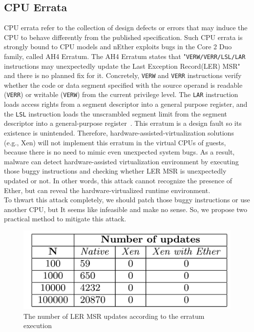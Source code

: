 \subsection{CPU Errata}
\label{sec:approach-errata}
CPU errata refer to the collection of design defects or errors that may induce the CPU to behave differently from the published specification. Such CPU errata is strongly bound to CPU models and nEther exploits bugs in the Core 2 Duo family, called AH4 Erratum. The AH4 Erratum states that "\texttt{VERW/VERR/LSL/LAR} instructions may unexpectedly update the Last Exception Record(LER) MSR" and there is no planned fix for it. Concretely, \texttt{VERW} and \texttt{VERR} instructions verify whether the code or data segment specified with the source operand is readable (\texttt{VERR}) or writable (\texttt{VERW}) from the current privilege level. The \texttt{LAR} instruction loads access rights from a segment descriptor into a general purpose register, and the \texttt{LSL} instruction loads the unscrambled segment limit from the segment descriptor into a general-purpose register~\cite{intelsys}. This erratum is a design fault so its existence is unintended. Therefore, hardware-assisted-virtualization solutions (e.g., Xen) will not implement this erratum in the virtual CPUs of guests, because there is no need to mimic even unexpected system bugs. As a result, malware can detect hardware-assisted virtualization environment by executing those buggy instructions and checking whether LER MSR is unexpectedly updated or not. In other words, this attack cannot recognize the presence of Ether, but can reveal the hardware-virtualized runtime environment. \\

To thwart this attack completely, we should patch those buggy instructions or use another CPU, but It seems like infeasible and make no sense. So, we propose two practical method to mitigate this attack.

\begin{figure}[!h]
	\centering
	\includegraphics[width=\linewidth]{figure/errata_table.png}
	\caption{The number of LER MSR updates according to the erratum execution}
	\label{fig:errata}
\end{figure}

